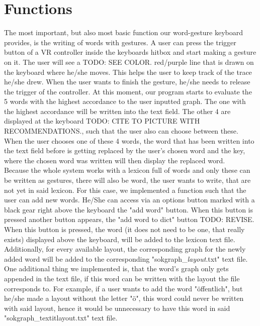 \section{Functions}
The most important, but also most basic function our word-gesture keyboard provides, is the writing of words with gestures. A user can press the trigger button of a VR controller inside the keyboards hitbox and start making a gesture on it. The user will see a TODO: SEE COLOR. red/purple line that is drawn on the keyboard where he/she moves. This helps the user to keep track of the trace he/she drew. When the user wants to finish the gesture, he/she needs to release the trigger of the controller. At this moment, our program starts to evaluate the 5 words with the highest accordance to the user inputted graph. The one with the highest accordance will be written into the text field. The other 4 are displayed at the keyboard TODO: CITE TO PICTURE WITH RECOMMENDATIONS., such that the user also can choose between these. When the user chooses one of these 4 words, the word that has been written into the text field before is getting replaced by the user's chosen word and the key, where the chosen word was written will then display the replaced word.\\
Because the whole system works with a lexicon full of words and only these can be written as gestures, there will also be word, the user wants to write, that are not yet in said lexicon. For this case, we implemented a function such that the user can add new words. He/She can access via an options button marked with a black gear right above the keyboard the "add word" button. When this button is pressed another button appears, the "add word to dict" button TODO: REVISE. When this button is pressed, the word (it does not need to be one, that really exists) displayed above the keyboard, will be added to the lexicon text file. Additionally, for every available layout, the corresponding graph for the newly added word will be added to the corresponding "sokgraph\_\textit{layout}.txt" text file. One additional thing we implemented is, that the word's graph only gets appended in the text file, if this word can be written with the layout the file corresponds to. For example, if a user wants to add the word "öffentlich", but he/she made a layout without the letter "ö", this word could never be written with said layout, hence it would be unnecessary to have this word in said "sokgraph\_textit{layout}.txt" text file.\\
